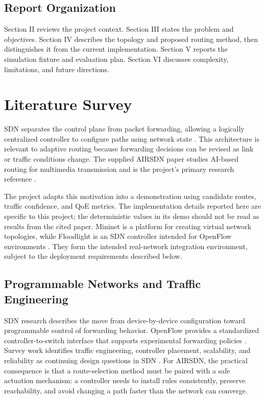\documentclass[conference]{IEEEtran}
\begin{document}
\subsection{Report Organization}
Section II reviews the project context. Section III states the problem and objectives. Section IV describes the topology and proposed routing method, then distinguishes it from the current implementation. Section V reports the simulation fixture and evaluation plan. Section VI discusses complexity, limitations, and future directions.

\section{Literature Survey}
SDN separates the control plane from packet forwarding, allowing a logically centralized controller to configure paths using network state \cite{kreutz2015sdn}. This architecture is relevant to adaptive routing because forwarding decisions can be revised as link or traffic conditions change. The supplied AIRSDN paper studies AI-based routing for multimedia transmission and is the project's primary research reference \cite{ipek2025airsdn}.

The project adapts this motivation into a demonstration using candidate routes, traffic confidence, and QoE metrics. The implementation details reported here are specific to this project; the deterministic values in its demo should not be read as results from the cited paper. Mininet is a platform for creating virtual network topologies, while Floodlight is an SDN controller intended for OpenFlow environments \cite{mininet,floodlight}. They form the intended real-network integration environment, subject to the deployment requirements described below.

\subsection{Programmable Networks and Traffic Engineering}
SDN research describes the move from device-by-device configuration toward programmable control of forwarding behavior. OpenFlow provides a standardized controller-to-switch interface that supports experimental forwarding policies \cite{mckeown2008openflow}. Survey work identifies traffic engineering, controller placement, scalability, and reliability as continuing design questions in SDN \cite{hu2014sdn,nunes2014sdn}. For AIRSDN, the practical consequence is that a route-selection method must be paired with a safe actuation mechanism: a controller needs to install rules consistently, preserve reachability, and avoid changing a path faster than the network can converge.
\end{document}
